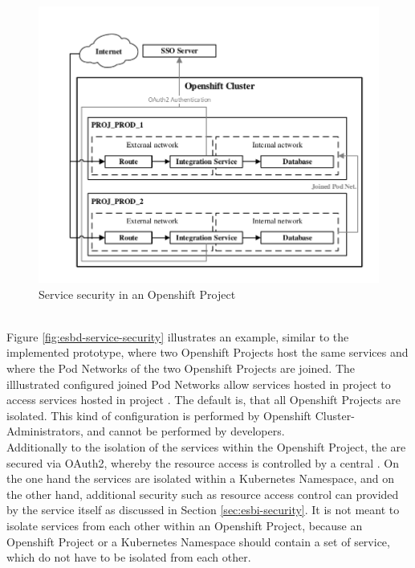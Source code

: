 \begin{figure}[htbp]
	\centering
	\includegraphics[scale=1]{images/esbd-service-security.pdf}
	\caption{Service security in an Openshift Project}
	\label{fig:esbd-service-security}
\end{figure}
\ \\
Figure \vref{fig:esbd-service-security} illustrates an example, similar to the implemented prototype, where two Openshift Projects host the same services and where the Pod Networks of the two Openshift Projects are joined. The illlustrated configured joined Pod Networks allow services hosted in project  to access services hosted in project . The default is, that all Openshift Projects are isolated. This kind of configuration is performed by Openshift Cluster-Administrators, and cannot be performed by developers. \\

Additionally to the isolation of the services within the Openshift Project, the  are secured via OAuth2, whereby the resource access is controlled by a central . On the one hand the services are isolated within a Kubernetes Namespace, and on the other hand, additional security such as resource access control can provided by the service itself as discussed in Section \vref{sec:esbi-security}. It is not meant to isolate services from each other within an Openshift Project, because an Openshift Project or a Kubernetes Namespace should contain a set of service, which do not have to be isolated from each other. \\

